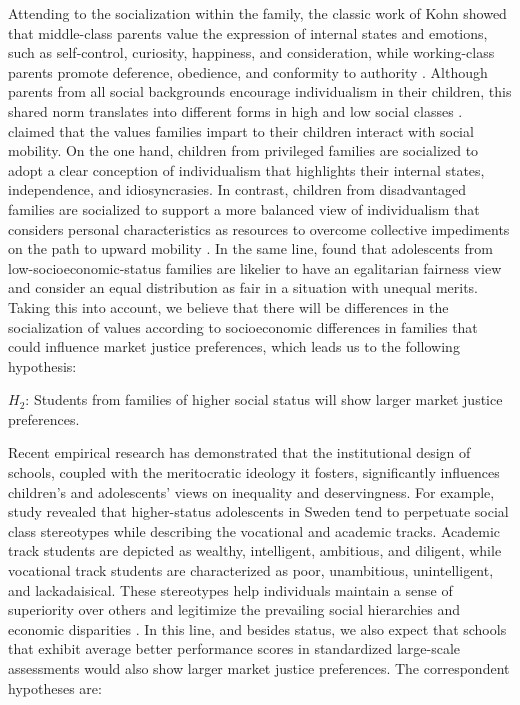\documentclass[
    behavsci,
    article,
    submit,
moreauthors
]{mdpi}
\begin{document}
Attending to the socialization within the family, the classic work of
Kohn showed that middle-class parents value the expression of internal
states and emotions, such as self-control, curiosity, happiness, and
consideration, while working-class parents promote deference, obedience,
and conformity to authority \citep{kohn_social_1963, kohn_class_1969}.
Although parents from all social backgrounds encourage individualism in
their children, this shared norm translates into different forms in high
and low social classes \citeyearpar{kohn_class_1969}.
\citet{acemoglu_obedience_2021} claimed that the values families impart
to their children interact with social mobility. On the one hand,
children from privileged families are socialized to adopt a clear
conception of individualism that highlights their internal states,
independence, and idiosyncrasies. In contrast, children from
disadvantaged families are socialized to support a more balanced view of
individualism that considers personal characteristics as resources to
overcome collective impediments on the path to upward mobility
\citep{iacoviello_collectivism_2019}. In the same line,
\citet{almas_fairness_2017} found that adolescents from
low-socioeconomic-status families are likelier to have an egalitarian
fairness view and consider an equal distribution as fair in a situation
with unequal merits. Taking this into account, we believe that there
will be differences in the socialization of values according to
socioeconomic differences in families that could influence market
justice preferences, which leads us to the following hypothesis:

\(H_2\): Students from families of higher social status will show larger
market justice preferences.

Recent empirical research has demonstrated that the institutional design
of schools, coupled with the meritocratic ideology it fosters,
significantly influences children's and adolescents' views on inequality
and deservingness. For example, \citet{jonsson_institutional_2015} study
revealed that higher-status adolescents in Sweden tend to perpetuate
social class stereotypes while describing the vocational and academic
tracks. Academic track students are depicted as wealthy, intelligent,
ambitious, and diligent, while vocational track students are
characterized as poor, unambitious, unintelligent, and lackadaisical.
These stereotypes help individuals maintain a sense of superiority over
others and legitimize the prevailing social hierarchies and economic
disparities \citep{jost_attitudinal_2000}. In this line, and besides
status, we also expect that schools that exhibit average better
performance scores in standardized large-scale assessments would also
show larger market justice preferences. The correspondent hypotheses
are:
\end{document}
